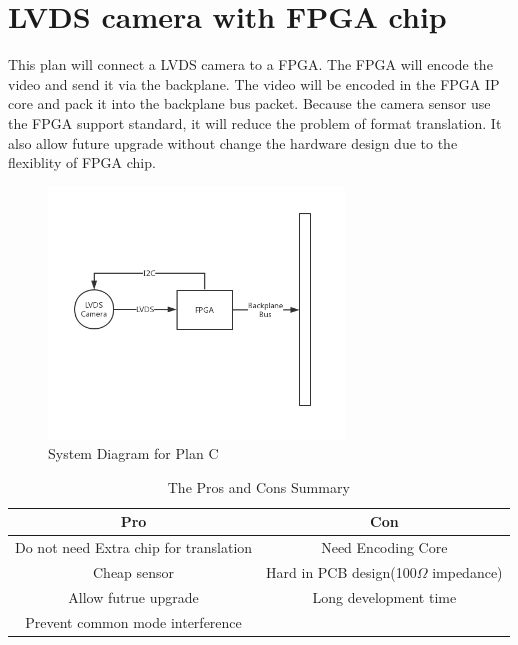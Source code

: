 \documentclass[12pt,article]{memoir}
\begin{document}
\section{LVDS camera with FPGA chip}
This plan will connect a LVDS camera to a FPGA. The FPGA will encode the video and send it via the backplane. The video will be encoded in the FPGA IP core and pack it into the backplane bus packet. Because the camera sensor use the FPGA support standard, it will reduce the problem of format translation. It also allow future upgrade without change the hardware design due to the flexiblity of FPGA chip.
\begin{figure}[htp]
\begin{center}
\includegraphics[width=0.7\textwidth]{img/DR00002_Plan3.png}
 \caption{System Diagram for Plan C}	
\end{center}
\end{figure}
\begin{table}[H]
	\centering
		\begin{tabu}{c | c }
		Pro & Con \\ \hline
		Do not need Extra chip for translation & Need Encoding Core \\
		Cheap sensor & Hard in PCB design(100$\Omega$ impedance) \\
		Allow futrue upgrade & Long development time \\
		Prevent common mode interference  &  \\
		\end{tabu}
	\caption{The Pros and Cons Summary}
\end{table}
\newpage
\end{document}
